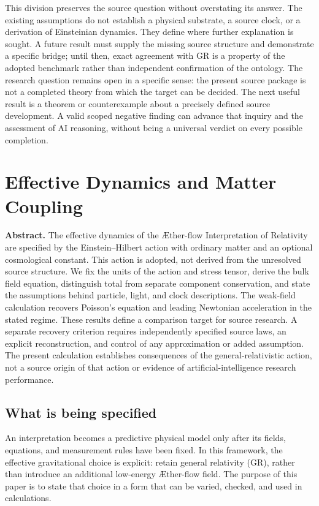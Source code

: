\documentclass[11pt,oneside]{report}
\newcommand{\ArticleShort}{}
\newcommand{\Aflow}{\AE{}ther-flow}
\theoremstyle{remark}
\numberwithin{definition}{chapter}
\numberwithin{proposition}{chapter}
\numberwithin{remark}{chapter}
\newcommand{\ChapterAbstract}[1]{%
  \begingroup
  \setlength{\parindent}{0pt}%
  \small\textbf{Abstract.} #1\par
  \endgroup
  \vspace{0.55\baselineskip}%
}
\begin{document}
This division preserves the source question without overstating its answer. The existing assumptions do not establish a physical substrate, a source clock, or a derivation of Einsteinian dynamics. They define where further explanation is sought. A future result must supply the missing source structure and demonstrate a specific bridge; until then, exact agreement with GR is a property of the adopted benchmark rather than independent confirmation of the ontology.
The research question remains open in a specific sense: the present source package is not a completed theory from which the target can be decided. The next useful result is a theorem or counterexample about a precisely defined source development. A valid scoped negative finding can advance that inquiry and the assessment of AI reasoning, without being a universal verdict on every possible completion.

\clearpage
\renewcommand{\ArticleShort}{Dynamics}
\chapter{Effective Dynamics and Matter Coupling}
\label{chapter:dynamics}
\ChapterAbstract{The effective dynamics of the \Aflow{} Interpretation of Relativity are specified by the Einstein--Hilbert action with ordinary matter and an optional cosmological constant. This action is adopted, not derived from the unresolved source structure. We fix the units of the action and stress tensor, derive the bulk field equation, distinguish total from separate component conservation, and state the assumptions behind particle, light, and clock descriptions. The weak-field calculation recovers Poisson's equation and leading Newtonian acceleration in the stated regime. These results define a comparison target for source research. A separate recovery criterion requires independently specified source laws, an explicit reconstruction, and control of any approximation or added assumption. The present calculation establishes consequences of the general-relativistic action, not a source origin of that action or evidence of artificial-intelligence research performance.}

\section{What is being specified}
An interpretation becomes a predictive physical model only after its fields, equations, and measurement rules have been fixed. In this framework, the effective gravitational choice is explicit: retain general relativity (GR), rather than introduce an additional low-energy \Aflow{} field. The purpose of this paper is to state that choice in a form that can be varied, checked, and used in calculations.
\end{document}

